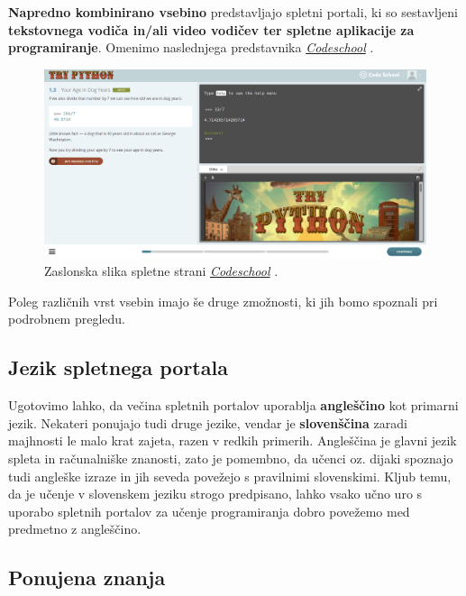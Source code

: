 \textbf{Napredno kombinirano vsebino} predstavljajo spletni portali, ki so
sestavljeni \textbf{tekstovnega vodiča in/ali video vodičev ter
  spletne aplikacije za programiranje}. Omenimo naslednjega
predstavnika \emph{\href{https://www.codeschool.com/}{Codeschool}}
\cite{web:codeschool}.

\begin{figure}[h!]
    \includegraphics [width=1\linewidth, keepaspectratio =
    1] {./images/sc_web/codeschool_01.png}
    \caption{Zaslonska slika spletne strani
      \emph{\href{https://www.codeschool.com/}{Codeschool}}
      \cite{web:codeschool}.}
    \label{fig:scr:web:codeschool}
\end{figure}

Poleg različnih vrst vsebin imajo še druge zmožnosti, ki jih bomo
spoznali pri podrobnem pregledu.

\subsection{Jezik spletnega portala}
\label{sec:jezik_spletnega_portala}

Ugotovimo lahko, da večina spletnih portalov uporablja
\textbf{angleščino} kot primarni jezik. Nekateri ponujajo tudi druge
jezike, vendar je \textbf{slovenščina} zaradi majhnosti le malo krat
zajeta, razen v redkih primerih. Angleščina je glavni jezik spleta in
računalniške znanosti, zato je pomembno, da učenci oz. dijaki spoznajo
tudi angleške izraze in jih seveda povežejo s pravilnimi
slovenskimi. Kljub temu, da je učenje v slovenskem jeziku strogo
predpisano, lahko vsako učno uro s uporabo spletnih portalov za učenje
programiranja dobro povežemo med predmetno z angleščino.


\subsection{Ponujena znanja}
\label{sec:vsebina_problemsk_pristop}

